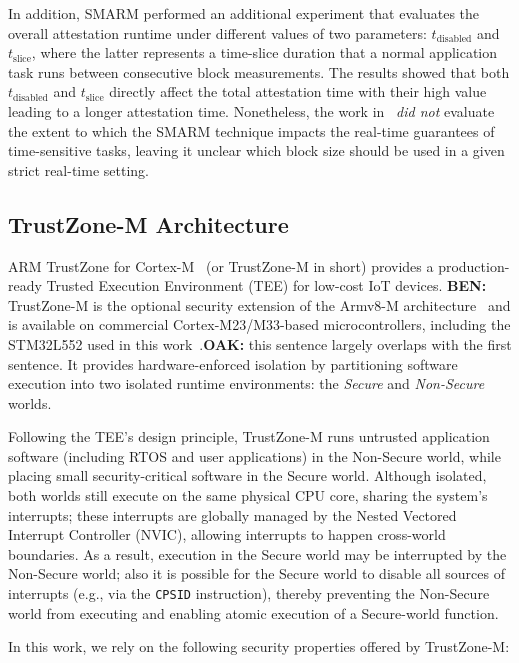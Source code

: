 \documentclass{ieeeaccess}
\DeclareRobustCommand{\oak}[1]{{\color{OAKcolor}\textbf{OAK:} #1}}
\DeclareRobustCommand{\ben}[1]{{\color{BENcolor}\textbf{BEN:} #1}}
\begin{document}
In addition, SMARM performed an additional experiment that evaluates the overall attestation runtime under different values of two parameters: $t_{\text{disabled}}$ and $t_{\text{slice}}$, where the latter represents a time-slice duration that a normal application task runs between consecutive block measurements.
The results showed that both $t_{\text{disabled}}$ and $t_{\text{slice}}$ directly affect the total attestation time with their high value leading to a longer attestation time.
Nonetheless, the work in~\cite{smarm} \emph{did not} evaluate the extent to which the SMARM technique impacts the real-time guarantees of time-sensitive tasks, leaving it unclear which block size should be used in a given strict real-time setting.

\subsection{TrustZone-M Architecture}\label{subsec:tzm}



ARM TrustZone for Cortex-M~\cite{arm-trustzone-cm} (or TrustZone-M in short) provides a production-ready Trusted Execution Environment (TEE) for low-cost IoT devices.
\ben{TrustZone-M is the optional security extension of the Armv8-M architecture~\cite{armv8m-arm} and is available on commercial Cortex-M23/M33-based microcontrollers, including the STM32L552 used in this work~\cite{tzm-sec-iot,stm32l552_nucleo144}.}\oak{this sentence largely overlaps with the first sentence.}
It provides hardware-enforced isolation by partitioning software execution into two isolated runtime environments: the \emph{Secure} and \emph{Non-Secure} worlds.

Following the TEE's design principle, TrustZone-M runs untrusted application software (including RTOS and user applications) in the Non-Secure world, while placing small security-critical software in the Secure world.
Although isolated, both worlds still execute on the same physical CPU core, sharing the system's interrupts;
these interrupts are globally managed by the Nested Vectored Interrupt Controller (NVIC), allowing interrupts to happen cross-world boundaries.
As a result, execution in the Secure world may be interrupted by the Non-Secure world; also it is possible for the Secure world to disable all sources of interrupts (e.g., via the \texttt{CPSID} instruction), thereby preventing the Non-Secure world from executing and enabling atomic execution of a Secure-world function.

In this work, we rely on the following security properties offered by TrustZone-M:
\end{document}
